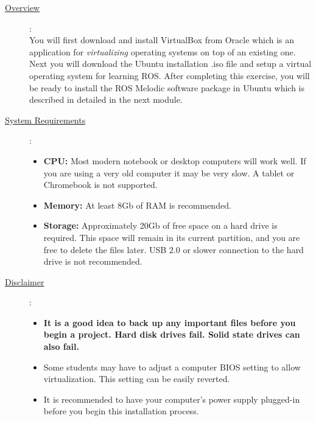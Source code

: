 \documentclass[12pt]{article}
\begin{document}
\begin{description}
	\item[\underline{Overview}]: \vspace{0mm} \\

		        You will first download and install VirtualBox from Oracle which is an application for {\it virtualizing} operating systems on top of an existing one. Next you will download the Ubuntu installation .iso file and setup a virtual operating system for learning ROS.  After completing this exercise, you will be ready to install the ROS Melodic software package in Ubuntu which is described in detailed in the next module. 

	\item[\underline{System Requirements}]: \vspace{0mm} \\

		        \begin{itemize}

					\item {\bf CPU:} Most modern notebook or desktop computers will work well. If you are using a very old computer it may be very slow. A tablet or Chromebook is not supported.
					\item {\bf Memory:} At least 8Gb of RAM is recommended.        
                    \item {\bf Storage:} Approximately 20Gb of free space on a hard drive is required. This space will remain in its current partition, and you are free to delete the files later. USB 2.0 or slower connection to the hard drive is not recommended. 
    
                \end{itemize}
                
			\item[\underline{Disclaimer}]: 
			\begin{itemize}
			
				\item {\bf \R It is a good idea to back up any important files before you begin a project. Hard disk drives fail. Solid state drives can also fail. } 
				\item Some students may have to adjust a computer BIOS setting to allow virtualization. This setting can be easily reverted.   
				\item It is recommended to have your computer's power supply plugged-in before you begin this installation process. 
			
			\end{itemize} 			
			

\end{description}
\end{document}

